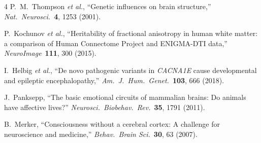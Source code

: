 \documentclass[aps,pre,twocolumn,superscriptaddress,floatfix]{revtex4-2}
\begin{document}
\begin{thebibliography}{4}
P.~M.~Thompson \textit{et al.},
``Genetic influences on brain structure,''
\textit{Nat.\ Neurosci.}\ \textbf{4}, 1253 (2001).

P.~Kochunov \textit{et al.},
``Heritability of fractional anisotropy in human white
matter: a comparison of Human Connectome Project and
ENIGMA-DTI data,''
\textit{NeuroImage}\ \textbf{111}, 300 (2015).

I.~Helbig \textit{et al.},
``De novo pathogenic variants in \textit{CACNA1E} cause
developmental and epileptic encephalopathy,''
\textit{Am.\ J.\ Hum.\ Genet.}\ \textbf{103}, 666 (2018).

J.~Panksepp,
``The basic emotional circuits of mammalian brains:
Do animals have affective lives?''
\textit{Neurosci.\ Biobehav.\ Rev.}\ \textbf{35}, 1791 (2011).

B.~Merker,
``Consciousness without a cerebral cortex:
A challenge for neuroscience and medicine,''
\textit{Behav.\ Brain Sci.}\ \textbf{30}, 63 (2007).
\end{thebibliography}
\end{document}
